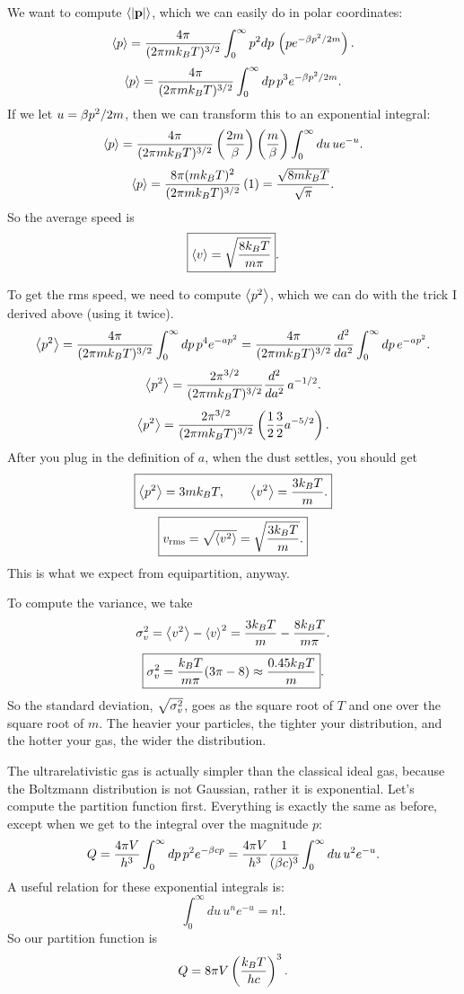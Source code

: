 \documentclass[12pt]{article}
\begin{document}
 We want to compute $\left \langle \left | \mathbf{p} \right | \right \rangle$, which we can easily do in polar coordinates:
\[ \left \langle p \right \rangle = \frac{4\pi}{(2\pi mk_BT)^{3/2}} \int_0^\infty p^2 dp\, \left(p e^{-\beta p^2/2m}\right).\]
\[ \left \langle p \right \rangle = \frac{4\pi}{(2\pi mk_BT)^{3/2}} \int_0^\infty dp\, p^3 e^{-\beta p^2/2m}.\]
If we let $u = \beta p^2/2m$, then we can transform this to an exponential integral:
\[ \left \langle p \right \rangle = \frac{4\pi}{(2\pi mk_BT)^{3/2}} \left(\frac{2 m}{\beta}\right)\left(\frac{m}{\beta}\right) \int_0^\infty du\, u e^{-u}.\]
\[ \left \langle p \right \rangle = \frac{8\pi (mk_BT)^2}{(2\pi m k_BT)^{3/2}} \left(1\right) = \frac{\sqrt{8 m k_BT}}{\sqrt{\pi}}.\]
So the average speed is
\[ \boxed{ \left \langle v \right \rangle = \sqrt{\frac{8k_BT}{m\pi}} }.\]

 To get the rms speed, we need to compute $\left \langle p^2 \right \rangle$, which we can do with the trick I derived above (using it twice).
\[ \left \langle p^2 \right \rangle = \frac{4\pi}{(2\pi mk_BT)^{3/2}} \int_0^{\infty} dp\, p^4 e^{-a p^2} = \frac{4\pi}{(2\pi mk_BT)^{3/2}} \frac{d {^2}}{d {a^2}} \int_0^\infty dp\, e^{-ap^2}.\]
\[ \left \langle p^2 \right \rangle = \frac{2\pi^{3/2}}{(2\pi mk_BT)^{3/2}} \frac{d {^2}}{d {a^2}}\, a^{-1/2}.\]
\[ \left \langle p^2 \right \rangle = \frac{2\pi^{3/2}}{(2\pi mk_BT)^{3/2}} \left( \frac{1}{2}\frac{3}{2} a^{-5/2}\right).\]
After you plug in the definition of $a$, when the dust settles, you should get
\[ \boxed{ \left \langle p^2 \right \rangle = 3mk_BT,\qquad \left \langle v^2 \right \rangle = \frac{3k_BT}{m}.} \]
\[ \boxed{ v_{\mathrm{rms}} = \sqrt{\left \langle v^2 \right \rangle} = \sqrt{\frac{3k_BT}{m}}.}\]
This is what we expect from equipartition, anyway.

 To compute the variance, we take
\[ \sigma^2_v = \left \langle v^2 \right \rangle - \left \langle v \right \rangle^2 = \frac{3k_BT}{m} - \frac{8k_BT}{m\pi}.\]
\[ \boxed{ \sigma^2_v = \frac{k_BT}{m\pi}(3\pi - 8) \approx \frac{0.45 k_BT}{m} }.\]
So the standard deviation, $\sqrt{\sigma^2_v}$, goes as the square root of $T$ and one over the square root of $m$. The heavier your particles, the tighter your distribution, and the hotter your gas, the wider the distribution.

\hrulefill

 The ultrarelativistic gas is actually simpler than the classical ideal gas, because the Boltzmann distribution is not Gaussian, rather it is exponential. Let's compute the partition function first. Everything is exactly the same as before, except when we get to the integral over the magnitude $p$:
\[ Q = \frac{4\pi V}{h^3} \int_0^{\infty} dp\, p^2 e^{-\beta c p} = \frac{4\pi V}{h^3} \frac{1}{(\beta c)^3} \int_0^\infty du\, u^2 e^{-u}.\]
A useful relation for these exponential integrals is:
\[ \int_0^{\infty} du \, u^{n} e^{-u} = n!.\]
So our partition function is
\[ Q = 8\pi V \left(\frac{k_BT}{hc}\right)^3.\]
\end{document}
